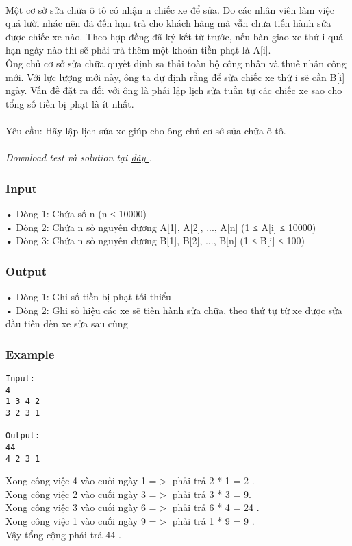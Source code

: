 

 

Một cơ sở sửa chữa ô tô có nhận n chiếc xe để sửa. Do các nhân viên làm việc quá lười nhác nên đã đến hạn trả cho khách hàng mà vẫn chưa tiến hành sửa được chiếc xe nào. Theo hợp đồng đã ký kết từ trước, nếu bàn giao xe thứ i quá hạn ngày nào thì sẽ phải trả thêm một khoản tiền phạt là A[i].
\\Ông chủ cơ sở sửa chữa quyết định sa thải toàn bộ công nhân và thuê nhân công mới. Với lực lượng mới này, ông ta dự định rằng để sửa chiếc xe thứ i sẽ cần B[i] ngày. Vấn đề đặt ra đối với ông là phải lập lịch sửa tuần tự các chiếc xe sao cho tổng số tiền bị phạt là ít nhất.
\\
\\Yêu cầu: Hãy lập lịch sửa xe giúp cho ông chủ cơ sở sửa chữa ô tô.
\\
\\\emph{Download test và solution tại \href{http://www.spoj.pl/CSP/content/CAR.rar}{ đây } . }

\subsubsection{Input}

• Dòng 1: Chứa số n (n ≤ 10000)
\\• Dòng 2: Chứa n số nguyên dương A[1], A[2], ..., A[n] (1 ≤ A[i] ≤ 10000)
\\• Dòng 3: Chứa n số nguyên dương B[1], B[2], ..., B[n] (1 ≤ B[i] ≤ 100)

\subsubsection{Output}

• Dòng 1: Ghi số tiền bị phạt tối thiểu
\\• Dòng 2: Ghi số hiệu các xe sẽ tiến hành sửa chữa, theo thứ tự từ xe được sửa đầu tiên đến xe sửa sau cùng

\subsubsection{Example}
\begin{verbatim}
Input:
4
1 3 4 2
3 2 3 1

Output:
44
4 2 3 1 

\end{verbatim}

Xong công việc 4 vào cuối ngày 1 =$>$ phải trả 2 * 1 = 2 .
\\Xong công việc 2 vào cuối ngày 3 =$>$ phải trả 3 * 3 = 9.
\\Xong công việc 3 vào cuối ngày 6 =$>$ phải trả 6 * 4 = 24 .
\\Xong công việc 1 vào cuối ngày 9 =$>$ phải trả 1 * 9 = 9 .
\\Vậy tổng cộng phải trả 44 .